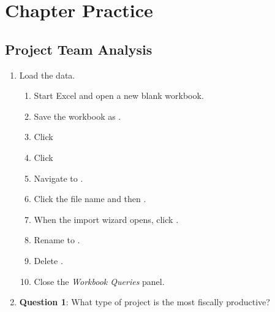 \section{Chapter Practice}

\subsection{Project Team Analysis}

\begin{enumbox}
	\begin{enumerate}
		\item Load the data.
	
		\begin{enumerate}
			\item Start Excel and open a new blank workbook.
			\item Save the workbook as .
			\item {} Click 
			\item {} Click 
			\item Navigate to .
			\item Click the file name and then .
			\item When the import wizard opens, click .
			\item Rename  to .
			\item Delete .
			\item Close the \textit{Workbook Queries} panel.
		\end{enumerate}
	
		\item{\textbf{Question 1}: What type of project is the most fiscally productive?}
	

\end{enumerate}
\end{enumbox}

